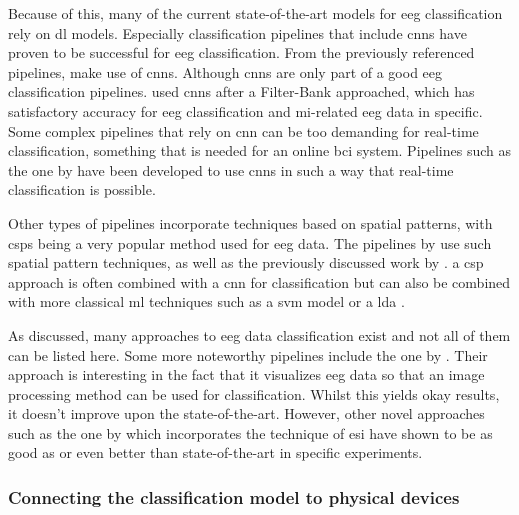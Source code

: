 Because of this, many of the current state-of-the-art models for \gls{eeg} classification rely on \gls{dl} models.
Especially classification pipelines that include \glspl{cnn} have proven to be successful for \gls{eeg} classification.
From the previously referenced pipelines, \citet{fbcnet, eeg_mi_model_mussi, eeg_mi_model_deep_cnn_spatial_filters, eeg_model_hbm, eeg_model_esi, eeg_model_eegnet} make use of \glspl{cnn}.
Although \glspl{cnn} are only part of a good \gls{eeg} classification pipelines.
 used \glspl{cnn} after a Filter-Bank approached, which has satisfactory accuracy for \gls{eeg} classification and \gls{mi}-related \gls{eeg} data in specific.
Some complex pipelines that rely on \gls{cnn} can be too demanding for real-time classification, something that is needed for an online \gls{bci} system.
Pipelines such as the one by \citet{eeg_model_eegnet} have been developed to use \glspl{cnn} in such a way that real-time classification is possible.

Other types of pipelines incorporate techniques based on spatial patterns, with \glspl{csp} being a very popular method used for \gls{eeg} data.
The pipelines by \citet{eeg_mi_model_lda_csp, eeg_mi_model_deep_cnn_spatial_filters} use such spatial pattern techniques, as well as the previously discussed work by \citet{cheap_bci_feasibility}.
a \gls{csp} approach is often combined with a \gls{cnn} for classification but can also be combined with more classical \gls{ml} techniques such as a \gls{svm} model or a \gls{lda} \citep{eeg_mi_model_lda_csp}.

As discussed, many approaches to \gls{eeg} data classification exist and not all of them can be listed here.
Some more noteworthy pipelines include the one by \citet{eeg_mi_model_image_based}.
Their approach is interesting in the fact that it visualizes \gls{eeg} data so that an image processing method can be used for classification.
Whilst this yields okay results, it doesn't improve upon the state-of-the-art.
However, other novel approaches such as the one by \citet{eeg_model_esi} which incorporates the technique of \gls{esi} have shown to be as good as or even better than state-of-the-art in specific experiments.




\subsubsection{Connecting the classification model to physical devices}
\label{subsubsec:bci_opportunities_obstacles_motivating_examples_physical_devices}

